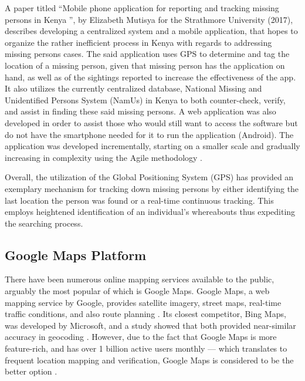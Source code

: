 A paper titled “Mobile phone application for reporting and tracking missing persons in Kenya ”, by Elizabeth Mutisya for the Strathmore University (2017), describes developing a centralized system and a mobile application, that hopes to organize the rather inefficient process in Kenya with regards to addressing missing persons cases. The said application uses GPS to determine and tag the location of a missing person, given that missing person has the application on hand, as well as of the sightings reported to increase the effectiveness of the app. It also utilizes the currently centralized database, National Missing and Unidentified Persons System (NamUs) in Kenya to both counter-check, verify, and assist in finding these said missing persons. A web application was also developed in order to assist those who would still want to access the software but do not have the smartphone needed for it to run the application (Android). The application was developed incrementally, starting on a smaller scale and gradually increasing in complexity using the Agile methodology \cite{mutisya2017mobile}.


Overall, the utilization of the Global Positioning System (GPS) has provided an exemplary mechanism for tracking down missing persons by either identifying the last location the person was found or a real-time continuous tracking. This employs heightened identification of an individual’s whereabouts thus expediting the searching process.

\subsection{Google Maps Platform}

There have been numerous online mapping services available to the public, arguably the most popular of which is Google Maps. Google Maps, a web mapping service by Google, provides satellite imagery, street maps, real-time traffic conditions, and also route planning \cite{antony_2021}. Its closest competitor, Bing Maps, was developed by Microsoft, and a study showed that both provided near-similar accuracy in geocoding \cite{kilic2020accuracy}. However, due to the fact that Google Maps is more feature-rich, and has over 1 billion active users monthly — which translates to frequent location mapping and verification, Google Maps is considered to be the better option \cite{lookingbill2019google}.

